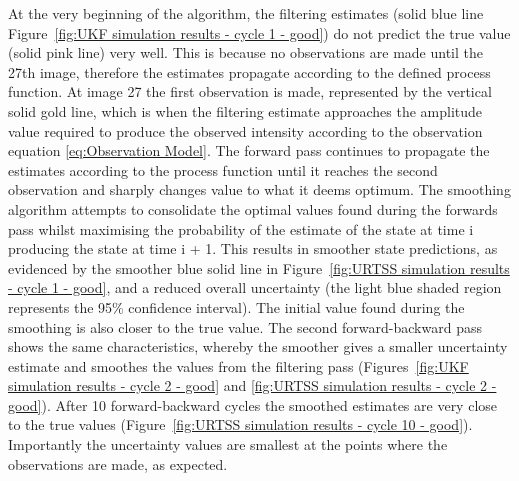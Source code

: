 At the very beginning of the algorithm, the filtering estimates (solid blue line Figure~\ref{fig:UKF simulation results - cycle 1 - good}) do not predict the true value (solid pink line) very well.
This is because no observations are made until the 27th image, therefore the estimates propagate according to the defined process function.
At image 27 the first observation is made, represented by the vertical solid gold line, which is when the filtering estimate approaches the amplitude value required to produce the observed intensity according to the observation equation \ref{eq:Observation Model}.
The forward pass continues to propagate the estimates according to the process function until it reaches the second observation and sharply changes value to what it deems optimum.
The smoothing algorithm attempts to consolidate the optimal values found during the forwards pass whilst maximising the probability of the estimate of the state at time i producing the state at time i + 1.
This results in smoother state predictions, as evidenced by the smoother blue solid line in Figure~\ref{fig:URTSS simulation results - cycle 1 - good}, and a reduced overall uncertainty (the light blue shaded region represents the 95\% confidence interval).
The initial value found during the smoothing is also closer to the true value.
The second forward-backward pass shows the same characteristics, whereby the smoother gives a smaller uncertainty estimate and smoothes the values from the filtering pass (Figures~\ref{fig:UKF simulation results - cycle 2 - good} and \ref{fig:URTSS simulation results - cycle 2 - good}).
After 10 forward-backward cycles the smoothed estimates are very close to the true values (Figure~\ref{fig:URTSS simulation results - cycle 10 - good}).
Importantly the uncertainty values are smallest at the points where the observations are made, as expected.


